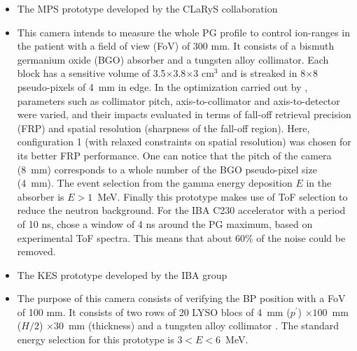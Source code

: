 \documentclass[a4paper,english,12pt]{article}
\begin{document}
\begin{itemize}[noitemsep]
\item The MPS prototype developed by the CLaRyS collaboration
\item[] This camera intends to measure the whole PG profile to control ion-ranges in the patient with a field of view (FoV) of 300 mm. It consists of a bismuth germanium oxide (BGO) absorber and a tungsten alloy collimator. Each block has a sensitive volume of 3.5$\times$3.8$\times$3 cm$^{3}$ and is streaked in 8$\times$8 pseudo-pixels of 4~mm in edge. In the optimization carried out by \cite{Pinto2014a}, parameters such as collimator pitch, axis-to-collimator and axis-to-detector were varied, and their impacts evaluated in terms of fall-off retrieval precision (FRP) and spatial resolution (sharpness of the fall-off region). Here, configuration 1 (with relaxed constraints on spatial resolution) was chosen for its better FRP performance. One can notice that the pitch of the camera (8~mm) corresponds to a whole number of the BGO pseudo-pixel size (4~mm). The event selection from the gamma energy deposition $E$ in the absorber is $E>1$~MeV. Finally this prototype makes use of ToF selection to reduce the neutron background. For the IBA C230 accelerator with a period of 10 ns, \cite{Pinto2014a} chose a window of 4 ns around the PG maximum, based on experimental ToF spectra. This means that about 60\% of the noise could be removed.

\item The KES prototype developed by the IBA group
\item[] The purpose of this camera consists of verifying the BP position with a FoV of 100 mm. It consists of two rows of 20 LYSO blocs of 4~mm ($p^{'}$) $\times 100$~mm ($H/2$) $\times30$~mm (thickness) and a tungsten alloy collimator \citep{Perali2014,Sterpin2015}. The standard energy selection for this prototype is $3<E<6$~MeV.
\end{itemize}
\end{document}
